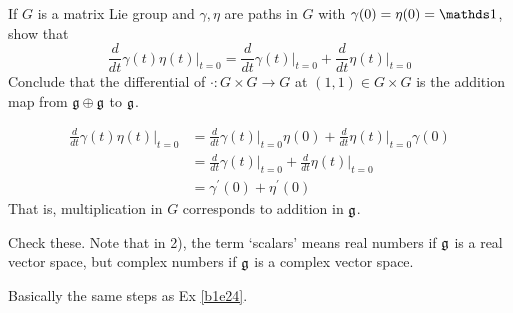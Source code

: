 \documentclass[10pt]{article}
\begin{document}
\begin{example}
	If $G$ is a matrix Lie group and $\gamma,\eta$ are paths in $G$ with $\gamma(0) = \eta(0) = \id$, show that
	$$
	\frac{d}{dt}\gamma(t)\eta(t)\Big|_{t=0} = \frac{d}{dt}\gamma(t)\Big|_{t=0} + \frac{d}{dt}\eta(t)\Big|_{t=0}
	$$
	Conclude that the differential of $\cdot:G\times G\to G$ at $(1,1) \in G\times G$ is the addition map from $\mathfrak{g} \oplus \mathfrak{g}$ to $\mathfrak{g}$.
\end{example}
\sol 
$$
\begin{aligned}
	\frac{d}{dt}\gamma(t)\eta(t)\Big|_{t=0} &= \frac{d}{dt}\gamma(t)\Big|_{t=0}\eta(0) + \frac{d}{dt}\eta(t)\Big|_{t=0}\gamma(0)\\
	&= \frac{d}{dt}\gamma(t)\Big|_{t=0} + \frac{d}{dt}\eta(t)\Big|_{t=0}\\
	&= \gamma^\prime(0) + \eta^\prime(0)
\end{aligned}
$$
That is, multiplication in $G$ corresponds to addition in $\mathfrak{g}$.


\begin{example}
	Check these. Note that in 2), the term `scalars' means real numbers if $\mathfrak{g}$ is a real vector space, but complex numbers if $\mathfrak{g}$ is a complex vector space.
\end{example}
\sol Basically the same steps as Ex \ref{b1e24}.
\end{document}
